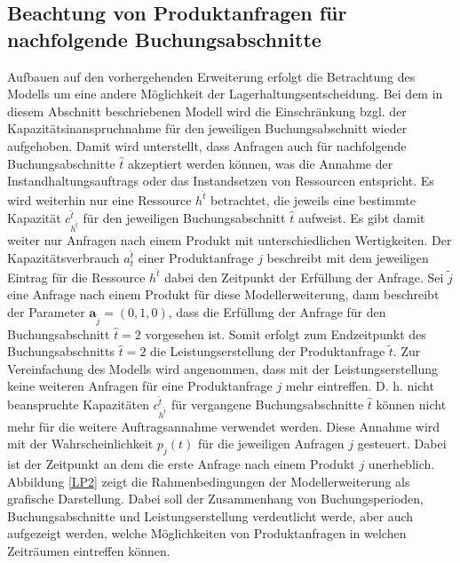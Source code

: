 \subsection{Beachtung von Produktanfragen für nachfolgende Buchungsabschnitte}

Aufbauen auf den vorhergehenden Erweiterung erfolgt die Betrachtung des Modells um eine andere Möglichkeit der Lagerhaltungsentscheidung. Bei dem in diesem Abschnitt beschriebenen Modell wird die Einschränkung bzgl. der Kapazitätsinanspruchnahme für den jeweiligen Buchungsabschnitt wieder aufgehoben. Damit wird unterstellt, dass Anfragen auch für nachfolgende Buchungsabschnitte $\hat{t}$ akzeptiert werden können, was die Annahme der Instandhaltungsauftrags oder das Instandsetzen von Ressourcen entspricht. Es wird weiterhin nur eine Ressource $h^{\hat{t}}$ betrachtet, die jeweils eine bestimmte Kapazität $c^{\hat{t}}_{h^{\hat t}}$ für den jeweiligen Buchungsabschnitt $\hat{t}$ aufweist. Es gibt damit weiter nur Anfragen nach einem Produkt mit unterschiedlichen Wertigkeiten. Der Kapazitätsverbrauch $a_{t}^{\hat{t}}$ einer Produktanfrage $j$ beschreibt mit dem jeweiligen Eintrag für die Ressource $h^{\hat t}$ dabei den Zeitpunkt der Erfüllung der Anfrage. Sei $\tilde{j}$ eine Anfrage nach einem Produkt für diese Modellerweiterung, dann beschreibt der Parameter $\textbf{a}_{\tilde{j}}=(0,1,0)$, dass die Erfüllung der Anfrage für den Buchungsabschnitt $\hat{t}=2$ vorgesehen ist. Somit erfolgt zum Endzeitpunkt des Buchungsabschnitts $\hat{t}=2$ die Leistungserstellung der Produktanfrage $\tilde t$. Zur Vereinfachung des Modells wird angenommen, dass mit der Leistungserstellung keine weiteren Anfragen für eine Produktanfrage $j$ mehr eintreffen. D. h. nicht beanspruchte Kapazitäten $c^{\hat{t}}_{h^{\hat t}}$ für vergangene Buchungsabschnitte $\hat t$ können nicht mehr für die weitere Auftragsannahme verwendet werden. Diese Annahme wird mit der Wahrscheinlichkeit $p_j(t)$ für die jeweiligen Anfragen $j$ gesteuert. Dabei ist der Zeitpunkt an dem die erste Anfrage nach einem Produkt $j$ unerheblich. Abbildung \ref{LP2} zeigt die Rahmenbedingungen der Modellerweiterung als grafische Darstellung. Dabei soll der Zusammenhang von Buchungsperioden, Buchungsabschnitte und Leistungserstellung verdeutlicht werde, aber auch aufgezeigt werden, welche Möglichkeiten von Produktanfragen in welchen Zeiträumen eintreffen können.

